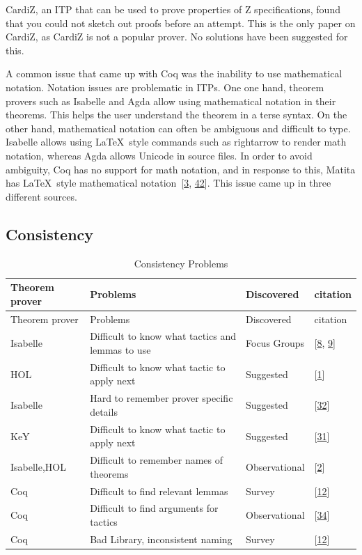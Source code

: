 \documentclass[
]{article}
\begin{document}
CardiZ, an ITP that can be used to prove properties of Z specifications,
found that you could not sketch out proofs before an attempt. This is
the only paper on CardiZ, as CardiZ is not a popular prover. No
solutions have been suggested for this.

A common issue that came up with Coq was the inability to use
mathematical notation. Notation issues are problematic in ITPs. One one
hand, theorem provers such as Isabelle and Agda allow using mathematical
notation in their theorems. This helps the user understand the theorem
in a terse syntax. On the other hand, mathematical notation can often be
ambiguous and difficult to type. Isabelle allows using LaTeX~style
commands such as rightarrow to render math notation, whereas Agda allows
Unicode in source files. In order to avoid ambiguity, Coq has no support
for math notation, and in response to this, Matita has LaTeX~style
mathematical notation~{[}\protect\hyperlink{ref-asperti_user_2007}{3},
\protect\hyperlink{ref-zacchiroli_user_2007}{42}{]}. This issue came up
in three different sources.

\hypertarget{consistency-1}{%
\subsection{Consistency}\label{consistency-1}}

\hypertarget{tbl:consistency}{}
\begin{longtable}[]{@{}llll@{}}
\caption{\label{tbl:consistency}Consistency Problems}\tabularnewline
\toprule
Theorem prover & Problems & Discovered & citation \\
\midrule
\endfirsthead
\toprule
Theorem prover & Problems & Discovered & citation \\
\midrule
\endhead
Isabelle & Difficult to know what tactics and lemmas to use & Focus
Groups & {[}\protect\hyperlink{ref-beckert_usability_2015}{8},
\protect\hyperlink{ref-beckert_interaction_2017}{9}{]} \\
HOL & Difficult to know what tactic to apply next & Suggested &
{[}\protect\hyperlink{ref-aitken_interactive_1998}{1}{]} \\
Isabelle & Hard to remember prover specific details & Suggested &
{[}\protect\hyperlink{ref-nagashima_pamper_2018}{32}{]} \\
KeY & Difficult to know what tactic to apply next & Suggested &
{[}\protect\hyperlink{ref-mitsch_keymaera_2017}{31}{]} \\
Isabelle,HOL & Difficult to remember names of theorems & Observational &
{[}\protect\hyperlink{ref-aitken_analysis_2000}{2}{]} \\
Coq & Difficult to find relevant lemmas & Survey &
{[}\protect\hyperlink{ref-berman_development_2014}{12}{]} \\
Coq & Difficult to find arguments for tactics & Observational &
{[}\protect\hyperlink{ref-ringer_replica_2020}{34}{]} \\
Coq & Bad Library, inconsistent naming & Survey &
{[}\protect\hyperlink{ref-berman_development_2014}{12}{]} \\
\bottomrule
\end{longtable}
\end{document}
